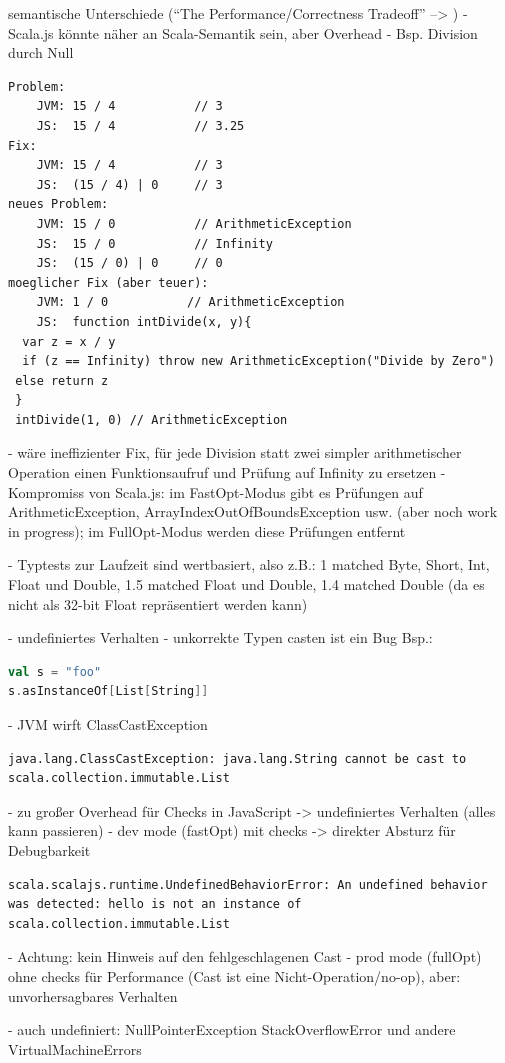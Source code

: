 \documentclass[a4paper, 12pt, listof=totoc, bibliography=totoc]{scrreprt}
\begin{document}
semantische Unterschiede ("`The Performance/Correctness Tradeoff"' --> \cite{haoyi.HOS})
- Scala.js könnte näher an Scala-Semantik sein, aber Overhead
- Bsp. Division durch Null
\begin{lstlisting}
Problem:
	JVM: 15 / 4           // 3
	JS:  15 / 4           // 3.25
Fix:
	JVM: 15 / 4           // 3
	JS:  (15 / 4) | 0     // 3
neues Problem:
	JVM: 15 / 0           // ArithmeticException
	JS:  15 / 0           // Infinity
	JS:  (15 / 0) | 0     // 0
moeglicher Fix (aber teuer):
	JVM: 1 / 0           // ArithmeticException
	JS:  function intDivide(x, y){
  var z = x / y
  if (z == Infinity) throw new ArithmeticException("Divide by Zero")
 else return z
 }
 intDivide(1, 0) // ArithmeticException
\end{lstlisting}
	- wäre ineffizienter Fix, für jede Division statt zwei simpler arithmetischer Operation einen Funktionsaufruf und Prüfung auf Infinity zu ersetzen
	- Kompromiss von Scala.js: im FastOpt-Modus gibt es Prüfungen auf ArithmeticException,  ArrayIndexOutOfBoundsException usw. (aber noch work in progress); im FullOpt-Modus werden diese Prüfungen entfernt
	
- Typtests zur Laufzeit sind wertbasiert, also z.B.: 1 matched Byte, Short, Int, Float und Double, 1.5 matched Float und Double, 1.4 matched Double (da es nicht als 32-bit Float repräsentiert werden kann)


- undefiniertes Verhalten
	- unkorrekte Typen casten ist ein Bug
		Bsp.:
\begin{lstlisting}[language=Scala]
val s = "foo"
s.asInstanceOf[List[String]]
\end{lstlisting}
	- JVM wirft ClassCastException
\begin{lstlisting}
java.lang.ClassCastException: java.lang.String cannot be cast to scala.collection.immutable.List
\end{lstlisting}
	- zu großer Overhead für Checks in JavaScript -> undefiniertes Verhalten (alles kann passieren)
	- dev mode (fastOpt) mit checks -> direkter Absturz für Debugbarkeit
\begin{lstlisting}
scala.scalajs.runtime.UndefinedBehaviorError: An undefined behavior was detected: hello is not an instance of scala.collection.immutable.List
\end{lstlisting}
		- Achtung: kein Hinweis auf den fehlgeschlagenen Cast
	- prod mode (fullOpt) ohne checks für Performance (Cast ist eine Nicht-Operation/no-op), aber: unvorhersagbares Verhalten
	
	- auch undefiniert:
		NullPointerException
		StackOverflowError und andere VirtualMachineErrors
		
\end{document}
